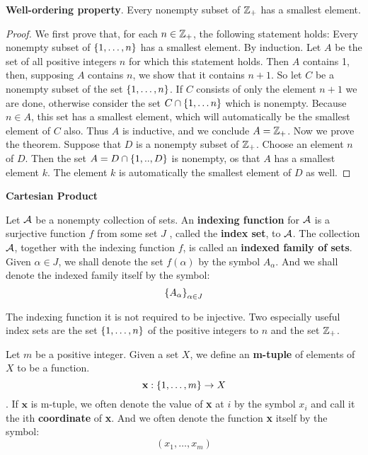 \begin{thm}
	\textbf{Well-ordering property}. Every nonempty subset of $ \mathbb{Z}_+ $ has a smallest element.
\end{thm}

\begin{proof}
	We first prove that, for each $ n \in \mathbb{Z}_+ $, the following statement holds: Every nonempty subset of $ \left\lbrace 1, \ldots, n \right\rbrace $ has a smallest element.
	By induction. Let $A$ be the set of all positive integers $ n $ for which this statement holds. Then $ A $ contains 1, then, supposing $ A $ contains $ n $, we show that it contains $ n+1 $. So let $ C $ be a nonempty subset of the set $ \left\lbrace 1, \ldots, n \right\rbrace $. If $ C $ consists of only the element $ n+1 $ we are done, otherwise consider the set $ C \cap \left\lbrace 1, \ldots n \right\rbrace $ which is nonempty. Because $ n \in A $, this set has a smallest element, which will automatically be the smallest element of $C$ also. Thus $A$ is inductive, and we conclude $ A=\mathbb{Z}_+ $. Now we prove the theorem. Suppose that $D$ is a nonempty subset of $\mathbb{Z}_+$. Choose an element $n$ of $D$. Then the set $A = D \cap \left\lbrace 1,..,D \right\rbrace$ is nonempty, os that $A$ has a smallest element $k$. The element $k$ is automatically the smallest element of $D$ as well.
\end{proof}

\textbf{ \LARGE Cartesian Product}

\begin{defn}
	Let $ \mathcal{A} $ be a nonempty collection of sets. An \textbf{indexing function } for $ \mathcal{A} $ is a surjective function $f$ from some set $J$ , called the \textbf{index set}, to $ \mathcal{A} $. The collection $ \mathcal{A} $, together with the indexing function $f$, is called an \textbf{indexed family of sets}. Given $ \alpha \in J $, we shall denote the set $ f(\alpha) $ by the symbol $ A_\alpha $. And we shall denote the indexed family itself by the symbol:
	\[ \left\lbrace A_\alpha \right\rbrace_{\alpha \in J} \]
	
\end{defn}

The indexing function it is not required to be injective. Two especially useful index sets are the set $ \left\lbrace 1, \ldots,n \right\rbrace $ of the positive integers to $n$ and the set $ \mathbb{Z}_+ $.

\begin{defn}
	Let $m$ be a positive integer. Given a set $X$, we define an \textbf{m-tuple } of elements of $X$ to be a function.
	\[ \textbf{x}: \left\lbrace 1, \ldots, m \right\rbrace \rightarrow X \].
	If $\textbf{x}$ is m-tuple, we often denote the value of \textbf{x} at $i$ by the symbol $x_i$ and call it the ith \textbf{coordinate} of \textbf{x}. And we often denote the function \textbf{x} itself by the symbol:
	\[ (x_1, \ldots,x_m) \]
\end{defn}

